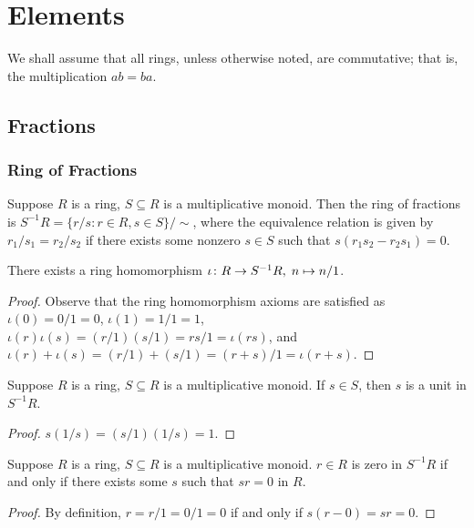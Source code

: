 \chapter{Elements}\label{ch:comm-alg}

\begin{remark}
    We shall assume that all rings,
    unless otherwise noted, are commutative;
    that is, the multiplication \(ab = ba\).
\end{remark}


\section{Fractions}

\subsection*{Ring of Fractions}

\begin{definition}
    Suppose \(R\) is a ring, \(S \subseteq R\) is a multiplicative monoid.
    Then the ring of fractions is \(S^{-1}R = \{r/s : r \in R, s \in S\}/{\sim}\),
    where the equivalence relation is given by \(r_1/s_1 = r_2/s_2\)
    if there exists some nonzero \(s \in S\) such that \(s(r_1s_2 - r_2s_1) = 0\).
\end{definition}
\begin{proposition}
    There exists a ring homomorphism \(\iota\colon R\to S^{-1}R,\;n\mapsto n/1\).
\end{proposition}
\begin{proof}
    Observe that the ring homomorphism axioms are satisfied as
    \(\iota(0) = 0/1 = 0\),
    \(\iota(1) = 1/1 = 1\),
    \(\iota(r)\iota(s) = (r/1)(s/1) = rs/1 = \iota(rs)\),
    and \(\iota(r)+\iota(s) = (r/1)+(s/1) = (r+s)/1 = \iota(r+s)\).
\end{proof}
\begin{lemma}
    Suppose \(R\) is a ring, \(S \subseteq R\) is a multiplicative monoid.
    If \(s \in S\), then \(s\) is a unit in \(S^{-1}R\).
\end{lemma}
\begin{proof}
    \(s(1/s) = (s/1)(1/s) = 1\).
\end{proof}
\begin{lemma}
    Suppose \(R\) is a ring, \(S \subseteq R\) is a multiplicative monoid.
    \(r \in R\) is zero in \(S^{-1}R\) if and only if there exists some \(s\)
    such that \(sr = 0\) in \(R\).
\end{lemma}
\begin{proof}
    By definition, \(r = r/1 = 0/1 = 0\) if and only if \(s(r-0) = sr = 0\).
\end{proof}

